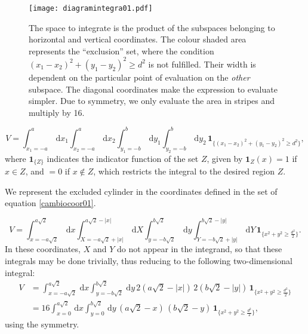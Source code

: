 \documentclass[letterpaper,12pt]{amsart}
\newcommand{\rd}{\, \mathrm{d}}
\newcommand{\indicator}[1]{\mathbf{1}_{ \{   #1 \} } }
\begin{document}
\begin{figure}[h]
  \centering
  \texttt{[image: diagramintegra01.pdf]}
  \caption{The space to integrate is the product of the subspaces
    belonging to horizontal and vertical coordinates. The colour
    shaded area represents the ``exclusion'' set, where the condition 
    $ (x_1-x_2)^2 + (y_1-y_2)^2 \ge d^2 $ is not fulfilled. 
    Their width is dependent on the particular point of evaluation
    on the \emph{other} subspace. The diagonal coordinates
    make the expression to evaluate simpler. Due to 
    symmetry, we only evaluate the area in stripes and
    multiply by 16.}\label{diagintegra01}
\end{figure}

\begin{equation}
 V = \int_{x_1 = -a}^a \rd x_1 \int_{x_2 = -a}^a \rd x_2 
\int_{y_1 = -b}^b \rd y_1 \int_{y_2 = -b}^b \rd y_2 \, \indicator{ (x_1-x_2)^2 + (y_1-y_2)^2 \ge d^2 },
\end{equation}
where $\indicator{Z}$ indicates the indicator function of the set $Z$, given by $\mathbf{1}_Z (x) = 1$ if $x \in Z$, and $=0$ if $x \notin Z$, which restricts the integral to the desired region $Z$.

We represent the excluded cylinder in the coordinates defined in 
the set of equation \ref{cambiocoor01}. 

\begin{equation}
 V = \int_{x=-a \sqrt{2}}^{a \sqrt{2}} \rd x 
\int_{X=-a \sqrt{2} + |x| }^{a \sqrt{2} - |x|}  \rd X
 \int_{y=-b \sqrt{2}}^{b \sqrt{2}} \rd y
\int_{Y=-b \sqrt{2} + |y| }^{b \sqrt{2}-|y|}  \rd Y
\, \indicator{ x^2 + y^2 \ge \frac{d^2}{2}  }.
\end{equation}
In these coordinates, $X$ and $Y$ do not appear 
in the integrand, so that these integrals may be done trivially, 
thus reducing to the following two-dimensional integral:
\begin{align}
 V &= \int_{x=-a \sqrt{2}}^{a \sqrt{2}} \rd x  
\int_{y=-b \sqrt{2}}^{b \sqrt{2}} \rd y
\, 2 \left( a \sqrt{2} - |x| \right) \, 2 \left( b \sqrt{2} - |y| \right) \,  
\indicator{ x^2 + y^2 \ge \frac{d^2}{2} } \\
&= 16 \int_{x=0}^{a \sqrt{2}} \rd x  \int_{y=0}^{b \sqrt{2}} \rd y
\, \left( a \sqrt{2} - x \right) \, \left( b \sqrt{2} - y \right) \,  
\indicator{ x^2 + y^2 \ge \frac{d^2}{2} },
\end{align}
using the symmetry.
\end{document}
